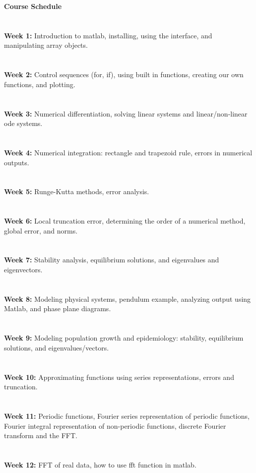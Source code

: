 \documentclass[11pt]{article}
\begin{document}
 {\bf Course Schedule}\\
 \ \\
 \ \\ 
\textbf{Week 1:} Introduction to matlab, installing, using the interface, and manipulating array objects. \\
\ \\
\ \\
\textbf{Week 2:} Control sequences (for, if), using built in functions, creating our own functions, and plotting. \\
\ \\
\ \\
\textbf{Week 3:} Numerical differentiation, solving linear systems and linear/non-linear ode systems. \\
\ \\
\ \\
\textbf{Week 4:} Numerical integration: rectangle and trapezoid rule, errors in numerical outputs.\\
\ \\
\ \\
\textbf{Week 5:} Runge-Kutta methods, error analysis.  \\
\ \\
\ \\
\textbf{Week 6:} Local truncation error, determining the order of a numerical method, global error,  and norms.   \\
\ \\
\ \\
\textbf{Week 7:} Stability analysis, equilibrium solutions, and eigenvalues and eigenvectors.\\
\ \\
\ \\
\textbf{Week 8:} Modeling physical systems, pendulum example, analyzing output using Matlab, and phase plane diagrams. \\
\ \\
\ \\
\textbf{Week 9:} Modeling population growth and epidemiology: stability, equilibrium solutions, and eigenvalues/vectors. \\
\ \\
\ \\
\textbf{Week 10:} Approximating functions using series representations, errors and truncation. \\
\ \\
\ \\
\textbf{Week 11:} Periodic functions, Fourier series representation of periodic functions, Fourier integral representation of non-periodic functions, discrete Fourier transform and the FFT. \\
\ \\
\ \\

\textbf{Week 12:} FFT of real data, how to use fft function in matlab. \\
\end{document}
